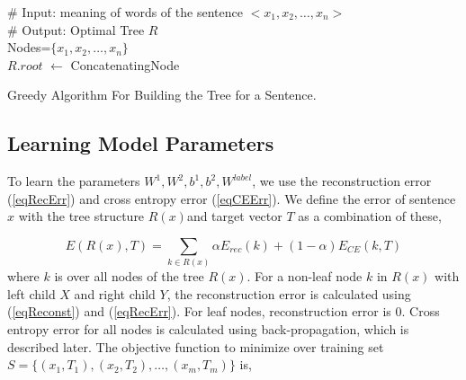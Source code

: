 \documentclass[twoside,12pt]{article}
\begin{document}
\begin{algorithm}[h!]
\# Input: meaning of words of the sentence $<x_1, x_2, \ldots, x_n>$\\ 
\# Output: Optimal Tree $R$\\
Nodes=$\{x_1,x_2,\ldots,x_n\}$\\
$R.root$ $\leftarrow$ ConcatenatingNode
\caption{Greedy Algorithm For Building the Tree for a Sentence.}
\label{algGreedyTree}
\end{algorithm}

\subsection{Learning Model Parameters}
To learn the parameters $W^1,W^2,b^1,b^2,W^{label}$, we use the reconstruction error (\ref{eqRecErr}) and cross entropy error (\ref{eqCEErr}). We define the error of sentence $x$ with the tree structure $R(x)$and target vector $T$ as a combination of these,

\begin{equation}
E(R(x),T)=\sum_{k \in R(x)}\alpha E_{rec}(k)+(1-\alpha)E_{CE}(k,T)
\end{equation}
where $k$ is over all nodes of the tree $R(x)$. For a non-leaf node $k$ in $R(x)$ with left child $X$ and right child $Y$, the reconstruction error is calculated using (\ref{eqReconst}) and (\ref{eqRecErr}). For leaf nodes, reconstruction error is 0. Cross entropy error for all nodes is calculated using back-propagation, which is described later. The objective function to minimize over training set $S=\{(x_1,T_1),(x_2,T_2),\ldots,(x_m,T_m)\} $ is,
\end{document}

